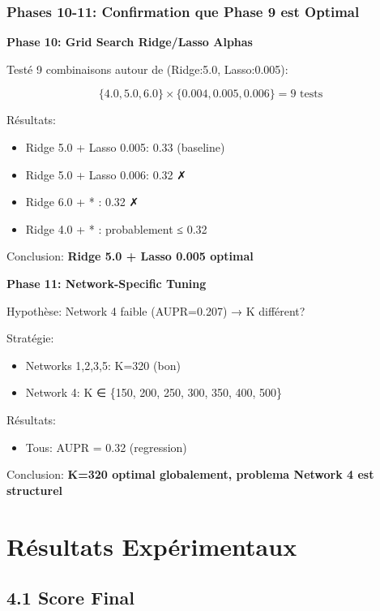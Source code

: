 \documentclass[12pt,a4paper,french]{article}
\begin{document}
\subsubsection{Phases 10-11: Confirmation que Phase 9 est Optimal}

\textbf{Phase 10: Grid Search Ridge/Lasso Alphas}

Testé 9 combinaisons autour de (Ridge:5.0, Lasso:0.005):

\begin{equation}
\{4.0, 5.0, 6.0\} \times \{0.004, 0.005, 0.006\} = 9 \text{ tests}
\end{equation}

Résultats:
\begin{itemize}
    \item Ridge 5.0 + Lasso 0.005: 0.33 (baseline)
    \item Ridge 5.0 + Lasso 0.006: 0.32 ✗
    \item Ridge 6.0 + * : 0.32 ✗
    \item Ridge 4.0 + * : probablement ≤ 0.32
\end{itemize}

Conclusion: \textbf{Ridge 5.0 + Lasso 0.005 optimal}

\textbf{Phase 11: Network-Specific Tuning}

Hypothèse: Network 4 faible (AUPR=0.207) → K différent?

Stratégie:
\begin{itemize}
    \item Networks 1,2,3,5: K=320 (bon)
    \item Network 4: K ∈ \{150, 200, 250, 300, 350, 400, 500\}
\end{itemize}

Résultats:
\begin{itemize}
    \item Tous: AUPR = 0.32 (regression)
\end{itemize}

Conclusion: \textbf{K=320 optimal globalement, problema Network 4 est structurel}

\section{Résultats Expérimentaux}

\subsection{4.1 Score Final}
\end{document}
